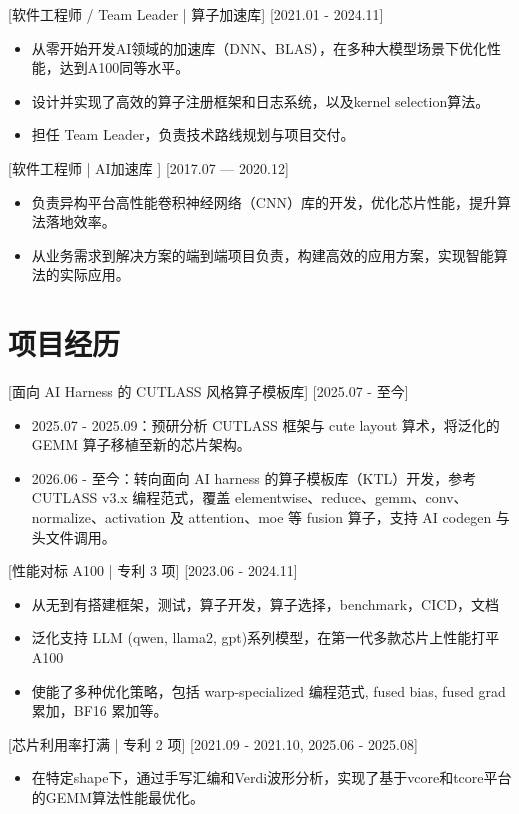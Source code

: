 \documentclass{resume}
\begin{document}
[软件工程师 / Team Leader | 算子加速库]
[2021.01 - 2024.11]
\begin{itemize}
    \item 从零开始开发AI领域的加速库（DNN、BLAS），在多种大模型场景下优化性能，达到A100同等水平。
    \item 设计并实现了高效的算子注册框架和日志系统，以及kernel selection算法。
    \item 担任 Team Leader，负责技术路线规划与项目交付。
\end{itemize}

[软件工程师 | AI加速库 ]
[2017.07 — 2020.12]
\begin{itemize}
    \item 负责异构平台高性能卷积神经网络（CNN）库的开发，优化芯片性能，提升算法落地效率。
    \item 从业务需求到解决方案的端到端项目负责，构建高效的应用方案，实现智能算法的实际应用。
\end{itemize}

\section{项目经历}

 [面向 AI Harness 的 CUTLASS 风格算子模板库]
[2025.07 - 至今]
\begin{itemize}
    \item 2025.07 - 2025.09：预研分析 CUTLASS 框架与 cute layout 算术，将泛化的 GEMM 算子移植至新的芯片架构。
    \item 2026.06 - 至今：转向面向 AI harness 的算子模板库（KTL）开发，参考 CUTLASS v3.x 编程范式，覆盖 elementwise、reduce、gemm、conv、normalize、activation 及 attention、moe 等 fusion 算子，支持 AI codegen 与头文件调用。
\end{itemize}

 [性能对标 A100 | 专利 3 项]
[2023.06 - 2024.11]
\begin{itemize}
    \item 从无到有搭建框架，测试，算子开发，算子选择，benchmark，CICD，文档
    \item 泛化支持 LLM (qwen, llama2, gpt)系列模型，在第一代多款芯片上性能打平 A100
    \item 使能了多种优化策略，包括 warp-specialized 编程范式, fused bias, fused grad 累加，BF16 累加等。
\end{itemize}

[芯片利用率打满 | 专利 2 项]
[2021.09 - 2021.10, 2025.06 - 2025.08]
\begin{itemize}
    \item 在特定shape下，通过手写汇编和Verdi波形分析，实现了基于vcore和tcore平台的GEMM算法性能最优化。
\end{itemize}
\end{document}
